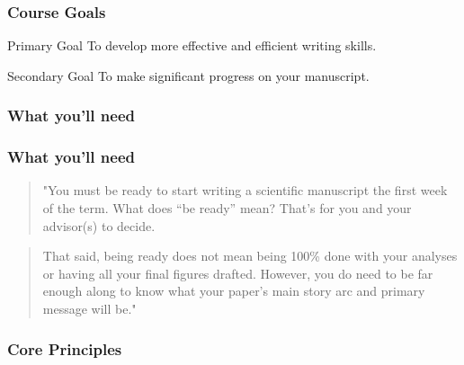 \documentclass{beamer}
\begin{document}
\begin{frame}
    \frametitle{Course Goals}

    \begin{block}{Primary Goal}
        To develop more effective and efficient writing skills.
    \end{block}

    \begin{block}{Secondary Goal}
        To make significant progress on your manuscript.
    \end{block}

\end{frame}

\subsubsection{What you'll need}


\begin{frame}
    \frametitle{What you'll need}

    \begin{quote}
    "You must be ready to start writing a scientific manuscript the first week of the term. What does “be ready” mean? 
    That’s for you and your advisor(s) to decide. 
    \end{quote}
    \bigskip
    \begin{quote}
    That said, being ready does not mean being 100\% done with your analyses or having all your final figures drafted.  
    However, you do need to be far enough along to know what your paper’s main story arc and primary message will be."
    \end{quote}

\end{frame}



\subsubsection{Core Principles}
\end{document}

